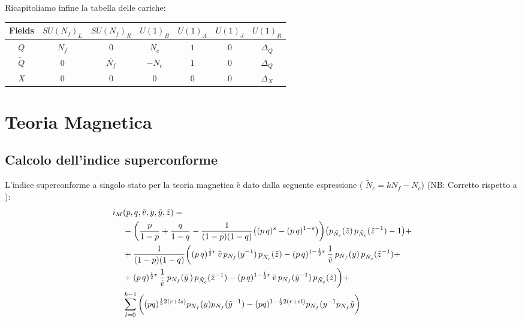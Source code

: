 \documentclass[a4paper,12pt]{article}
\begin{document}
Ricapitoliamo infine la tabella delle cariche:
\begin{table}[h!]
 \begin{tabular}{|c |c |c |c |c |c |c |}
\hline
Fields & $SU(N_f)_L$ & $SU(N_f)_R$ & $U(1)_B$ & $U(1)_A$ & $U(1)_J$ & $U(1)_R $ \\
\hline
$Q$ & $N_f$ & 0  &$ N_c $& $1 $& 0  & $\Delta_Q$ \\
$\tilde{Q} $  & 0  &$\overline{N_f}$ & $ - N_c $& $1 $ & 0 & $\Delta_Q$ \\
$X$ & 0 & 0 & 0 & 0 &0 & $\Delta_X$ \\
\hline
\end{tabular}
\centering
\end{table}

\newpage














\section{ Teoria Magnetica}
\subsection{Calcolo dell'indice superconforme}
L'indice superconforme a singolo stato per la teoria magnetica è dato dalla seguente espressione ( $\tilde N_c = k N_f - N_c$) (NB: Corretto rispetto a \citep{Dolan:2008qi}):
\begin{align*}
 i_M &(p,q, \tilde v, y,\tilde y ,\tilde z) =  \\
& -\bigg({p \over 1-p}+{q \over 1-q} -{1 \over (1-p)(1-q)} \big((p\,q)^{s}- (p\,q)^{1-s}\big)
\bigg) \big( p_{\tilde N_c}( \tilde z)\, p_{\tilde N_c}(\tilde z^{-1})-1\big ) + \\
& +{1\over (1-p)(1-q)}\bigg((p\,q)^{{1 \over 2 } r} \,\tilde v \, p_{N_f}(y^{-1})\, p_{\tilde N_c}(\tilde z)
- (p\,q)^{1-  {1\over 2}r} \, {1 \over \tilde v}\, p_{{N_f}}(y)\, p_{{\tilde N_c}}(\tilde z^{-1}) + \\
& + (p\,q)^{{1 \over 2 } r}\, {1\over \tilde v}\, p_{{N_f}}({\tilde y}\,) \, p_{{\tilde N_c}}(\tilde z^{-1})
- (p\,q)^{1-{1\over 2}r} \, \tilde v \, p_{N_f}({\tilde y}^{-1})\, p_{\tilde N_c}(\tilde z)\bigg) +  \,\\
&\sum_{l=0}^{k-1}   \bigg( (pq)^{ {1 \over 2 } 2 ( r + l s  )} p_{N_f}(y) p_{N_f}(\tilde y^{-1}) - (pq)^{1 -  {1 \over 2 } 2 ( r + s l )} p_{N_f}(y^{-1} p_{N_f}{\tilde y}\bigg)  \\
\end{align*}
\end{document}
